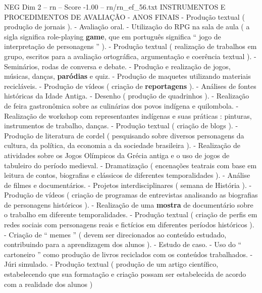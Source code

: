 \begin{textsample}{NEG Dim 2 – rn – Score -1.00 – rn/rn\_ef\_56.txt}  \label{ex:f2_neg_045}
INSTRUMENTOS E PROCEDIMENTOS DE AVALIAÇÃO - ANOS FINAIS - Produção textual ( produção de jornais ). - Avaliação oral. - Utilização do RPG na sala de aula ( a sigla significa role-playing \textbf{game}, que em português significa “ jogo de interpretação de personagens ” ). - Produção textual ( realização de trabalhos em grupo, escritos para a avaliação ortográfica, argumentação e coerência textual ). - Seminários, rodas de conversa e debate. - Produção e realização de jogos, músicas, danças, \textbf{paródias} e quiz. - Produção de maquetes utilizando materiais recicláveis. - Produção de vídeos ( criação de \textbf{reportagens} ). - Análises de fontes históricas da Idade Antiga. - Desenho ( produção de quadrinhos ). - Realização de feira gastronômica sobre as culinárias dos povos indígena e quilombola. - Realização de workshop com representantes indígenas e suas práticas : pinturas, instrumentos de trabalho, danças. - Produção textual ( criação de blogs ). - Produção de literatura de cordel ( pesquisando sobre diversos personagens da cultura, da política, da economia a da sociedade brasileira ). - Realização de atividades sobre os Jogos Olímpicos da Grécia antiga e o uso de jogos de tabuleiro do período medieval. - Dramatização ( encenações teatrais com base em leitura de contos, biografias e clássicos de diferentes temporalidades ). - Análise de filmes e documentários. - Projetos interdisciplinares ( semana de História ). - Produção de vídeos ( criação de programas de entrevistas analisando as biografias de personagens históricos ). - Realização de uma \textbf{mostra} de documentário sobre o trabalho em diferente temporalidades. - Produção textual ( criação de perfis em redes sociais com personagens reais e fictícios em diferentes períodos históricos ). - Criação de “ memes ” ( devem ser direcionados ao conteúdo estudado, contribuindo para a aprendizagem dos alunos ). - Estudo de caso. - Uso do “ cartoneiro ” como produção de livros reciclados com os conteúdos trabalhados. - Júri simulado. - Produção textual ( produção de um artigo científico, estabelecendo que sua formatação e criação possam ser estabelecida de acordo com a realidade dos alunos )

\end{textsample}
